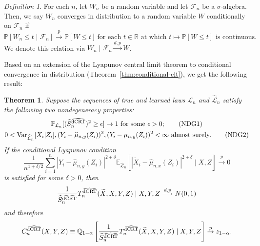 \documentclass[aos]{imsart}
\theoremstyle{plain}
\newtheorem{theorem}{Theorem}
\theoremstyle{remark}
\newtheorem{definition}{Definition}
\newcommand{\E}{\mathbb E}								%
\newcommand{\V}{\mathrm{Var}}							%
\renewcommand{\P}{\mathbb{P}}							%
\newcommand{\Q}{\mathbb{Q}}								%
\newcommand{\R}{\mathbb{R}}								%
\newcommand{\convp}{\overset p \rightarrow}             %
\newcommand{\srx}{X}									%
\newcommand{\srz}{Z}									%
\newcommand{\srxk}{\widetilde X}						%
\newcommand{\sry}{Y}									%
\newcommand{\law}{\mathcal L}							%
\newcommand{\lawhat}{\widehat{\mathcal L}}				%
\newcommand{\dCRThat}{\widehat{\textnormal{dCRT}}}		%
\newcommand{\convdp}{\overset {d,p} \longrightarrow}    %
\begin{document}
\begin{definition} \label{def:conditional-convergence-distribution}
    For each $n$, let $W_n$ be a random variable and let $\mathcal F_n$ be a $\sigma$-algebra. Then, we say $W_n$ converges in distribution to a random variable $W$ conditionally on $\mathcal F_n$ if
    \begin{equation}
        \P[W_n \leq t \mid \mathcal F_n] \convp \P[W \leq t] \ \text{for each } t \in \R \text{ at which } t \mapsto \P[W \leq t] \text{ is continuous.}
    \end{equation}
    We denote this relation via $W_n \mid \mathcal F_n \convdp W$.
\end{definition}

Based on an extension of the Lyapunov central limit theorem to conditional convergence in distribution (Theorem~\ref{thm:conditional-clt}), we get the following result:
\begin{theorem} \label{thm:normal-limit}
    Suppose the sequences of true and learned laws $\law_n$ and $\lawhat_n$ satisfy the following two nondegeneracy properties:
    \begin{gather}
        \P_{\law_n}[(\widehat S_{n}^{\dCRThat})^2 \geq \epsilon] \rightarrow 1 \ \text{for some } \epsilon > 0
        \label{eq:var-bounded-below}; \tag{NDG1} \\
        0 < \V_{\lawhat_n}[\srx_i|\srz_i], (\sry_i - \widehat \mu_{n, y}(\srz_i))^2, (\sry_i - \mu_{n, y}(\srz_i))^2 < \infty \ \text{almost surely}. \label{eq:variance-bounds} \tag{NDG2}
    \end{gather}
    If the conditional Lyapunov condition
    \begin{equation}
        \frac{1}{n^{1+\delta/2}} \sum_{i=1}^n |\sry_i-\widehat\mu_{n,y}(\srz_i)|^{2+\delta}\E_{\lawhat_n}\left[|\srxk_i-\widehat\mu_{n,x}(\srz_i)|^{2+\delta}\mid \srx,\srz\right] \convp 0
        \label{eq:lyapunov-condition} \tag{Lyap-1}
    \end{equation}
    is satisfied for some $\delta > 0$, then
    \begin{equation}
        \frac{1}{\widehat S_{n}^{\dCRThat}}T_n^{\dCRThat}(\srxk, \srx, \sry, \srz) \mid \srx, \sry, \srz \convdp N(0,1)
        \label{eq:conditional-convergence}
    \end{equation}
    and therefore
    \begin{equation}
        C^{\dCRThat}_n(\srx, \sry, \srz) \equiv \Q_{1-\alpha}\left[\frac{1}{\widehat S_{n}^{\dCRThat}}T_n^{\dCRThat}(\srxk, \srx, \sry, \srz) \mid \srx, \sry, \srz\right] \convp z_{1-\alpha}.
        \label{eq:critical-value-convergence}
    \end{equation}
\end{theorem}
\end{document}
